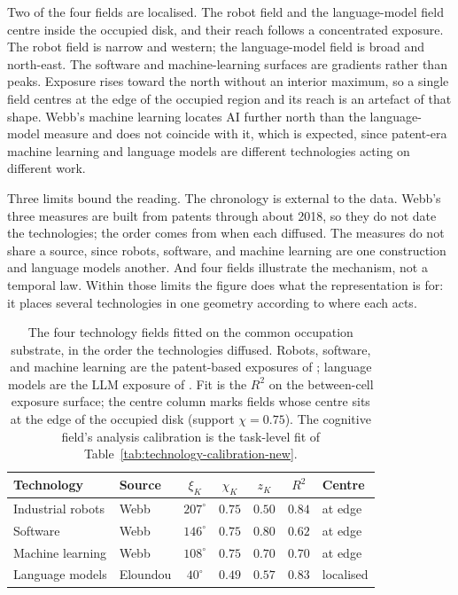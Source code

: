 \documentclass[12pt, a4paper]{article}
\begin{document}
Two of the four fields are localised. The robot field and the
language-model field centre inside the occupied disk, and their reach
follows a concentrated exposure. The robot field is narrow and western;
the language-model field is broad and north-east. The software and
machine-learning surfaces are gradients rather than peaks. Exposure
rises toward the north without an interior maximum, so a single field
centres at the edge of the occupied region and its reach is an artefact
of that shape. Webb's machine learning locates AI further north than the
language-model measure and does not coincide with it, which is expected,
since patent-era machine learning and language models are different
technologies acting on different work.

Three limits bound the reading. The chronology is external to the data.
Webb's three measures are built from patents through about 2018, so they
do not date the technologies; the order comes from when each diffused.
The measures do not share a source, since robots, software, and machine
learning are one construction and language models another. And four
fields illustrate the mechanism, not a temporal law. Within those limits
the figure does what the representation is for: it places several
technologies in one geometry according to where each acts.

\begin{table}[!htbp]
\centering
\caption{The four technology fields fitted on the common occupation
substrate, in the order the technologies diffused. Robots, software, and
machine learning are the patent-based exposures of \textcite{webb2020};
language models are the LLM exposure of \textcite{eloundou2024}. Fit is
the $R^2$ on the between-cell exposure surface; the centre column marks
fields whose centre sits at the edge of the occupied disk (support
$\chi=0.75$). The cognitive field's analysis calibration is the
task-level fit of Table~\ref{tab:technology-calibration-new}.}
\label{tab:webb-fields}
\begin{tabular}{llccccl}
\toprule
Technology & Source & $\xi_K$ & $\chi_K$ & $z_K$ & $R^2$ & Centre \\
\midrule
Industrial robots & Webb      & $207^\circ$ & $0.75$ & $0.50$ & $0.84$ & at edge \\
Software          & Webb      & $146^\circ$ & $0.75$ & $0.80$ & $0.62$ & at edge \\
Machine learning  & Webb      & $108^\circ$ & $0.75$ & $0.70$ & $0.70$ & at edge \\
Language models   & Eloundou  & $40^\circ$  & $0.49$ & $0.57$ & $0.83$ & localised \\
\bottomrule
\end{tabular}
\end{table}
\end{document}
